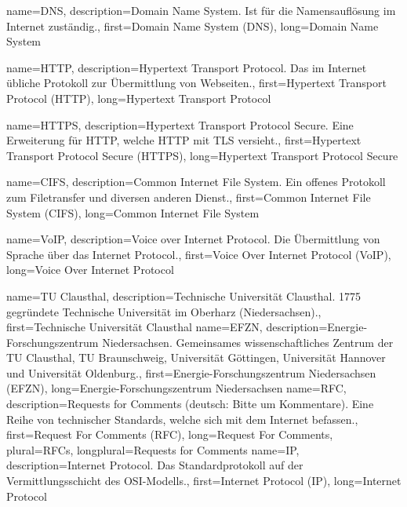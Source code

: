 {%
    name={DNS},
    description={Domain Name System. Ist für die Namensauflösung im
    Internet zuständig.},
    first={Domain Name System (DNS)},
    long={Domain Name System}
}

{%
    name={HTTP},
    description={Hypertext Transport Protocol. Das im Internet übliche
    Protokoll zur Übermittlung von Webseiten.},
    first={Hypertext Transport Protocol (HTTP)},
    long={Hypertext Transport Protocol}

}
{%
    name={HTTPS},
    description={Hypertext Transport Protocol Secure. Eine Erweiterung
    für HTTP, welche HTTP mit TLS versieht.},
    first={Hypertext Transport Protocol Secure (HTTPS)},
    long={Hypertext Transport Protocol Secure}

}
{%
    name={CIFS},
    description={Common Internet File System. Ein offenes
    Protokoll zum Filetransfer und diversen anderen Dienst.},
    first={Common Internet File System (CIFS)},
    long={Common Internet File System}

}
{%
    name={VoIP},
    description={Voice over Internet Protocol. Die Übermittlung von
    Sprache über das Internet Protocol.},
    first={Voice Over Internet Protocol (VoIP)},
    long={Voice Over Internet Protocol}

}
{%
    name={TU Clausthal},
    description={Technische Universität Clausthal. 1775 gegründete
    Technische Universität im Oberharz (Niedersachsen).},
    first={Technische Universität Clausthal}
}
{%
    name={EFZN},
    description={Energie-Forschungszentrum Niedersachsen. Gemeinsames
    wissenschaftliches Zentrum der TU Clausthal, TU Braunschweig,
    Universität Göttingen, Universität Hannover und Universität
    Oldenburg.},
    first={Energie-Forschungszentrum Niedersachsen (EFZN)},
    long={Energie-Forschungszentrum Niedersachsen}
}
{%
    name={RFC},
    description={Requests for Comments (deutsch: Bitte um Kommentare).
    Eine Reihe von technischer Standards, welche sich mit dem Internet
    befassen.},
    first={Request For Comments (RFC)},
    long={Request For Comments},
    plural={RFCs},
    longplural={Requests for Comments}
}
{%
    name={IP},
    description={Internet Protocol. Das Standardprotokoll auf der
    Vermittlungsschicht des OSI-Modells.},
    first={Internet Protocol (IP)},
    long={Internet Protocol}
}
